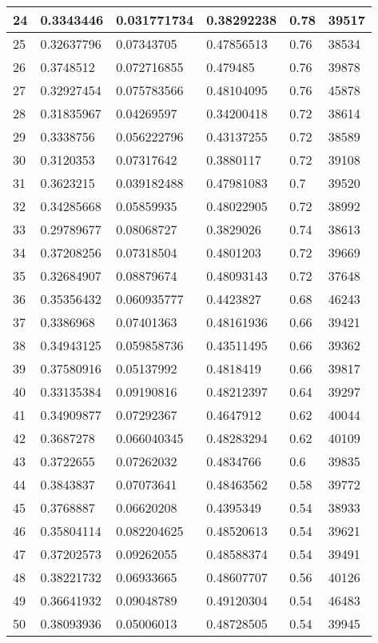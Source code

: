 \begin{longtable}{|l|l|l|l|l|l|}
24 & 0.3343446 & 0.031771734 & 0.38292238 & 0.78 & 39517 \\ \hline 
25 & 0.32637796 & 0.07343705 & 0.47856513 & 0.76 & 38534 \\ \hline 
26 & 0.3748512 & 0.072716855 & 0.479485 & 0.76 & 39878 \\ \hline 
27 & 0.32927454 & 0.075783566 & 0.48104095 & 0.76 & 45878 \\ \hline 
28 & 0.31835967 & 0.04269597 & 0.34200418 & 0.72 & 38614 \\ \hline 
29 & 0.3338756 & 0.056222796 & 0.43137255 & 0.72 & 38589 \\ \hline 
30 & 0.3120353 & 0.07317642 & 0.3880117 & 0.72 & 39108 \\ \hline 
31 & 0.3623215 & 0.039182488 & 0.47981083 & 0.7 & 39520 \\ \hline 
32 & 0.34285668 & 0.05859935 & 0.48022905 & 0.72 & 38992 \\ \hline 
33 & 0.29789677 & 0.08068727 & 0.3829026 & 0.74 & 38613 \\ \hline 
34 & 0.37208256 & 0.07318504 & 0.4801203 & 0.72 & 39669 \\ \hline 
35 & 0.32684907 & 0.08879674 & 0.48093143 & 0.72 & 37648 \\ \hline 
36 & 0.35356432 & 0.060935777 & 0.4423827 & 0.68 & 46243 \\ \hline 
37 & 0.3386968 & 0.07401363 & 0.48161936 & 0.66 & 39421 \\ \hline 
38 & 0.34943125 & 0.059858736 & 0.43511495 & 0.66 & 39362 \\ \hline 
39 & 0.37580916 & 0.05137992 & 0.4818419 & 0.66 & 39817 \\ \hline 
40 & 0.33135384 & 0.09190816 & 0.48212397 & 0.64 & 39297 \\ \hline 
41 & 0.34909877 & 0.07292367 & 0.4647912 & 0.62 & 40044 \\ \hline 
42 & 0.3687278 & 0.066040345 & 0.48283294 & 0.62 & 40109 \\ \hline 
43 & 0.3722655 & 0.07262032 & 0.4834766 & 0.6 & 39835 \\ \hline 
44 & 0.3843837 & 0.07073641 & 0.48463562 & 0.58 & 39772 \\ \hline 
45 & 0.3768887 & 0.06620208 & 0.4395349 & 0.54 & 38933 \\ \hline 
46 & 0.35804114 & 0.082204625 & 0.48520613 & 0.54 & 39621 \\ \hline 
47 & 0.37202573 & 0.09262055 & 0.48588374 & 0.54 & 39491 \\ \hline 
48 & 0.38221732 & 0.06933665 & 0.48607707 & 0.56 & 40126 \\ \hline 
49 & 0.36641932 & 0.09048789 & 0.49120304 & 0.54 & 46483 \\ \hline 
50 & 0.38093936 & 0.05006013 & 0.48728505 & 0.54 & 39945 \\ \hline 
\end{longtable}